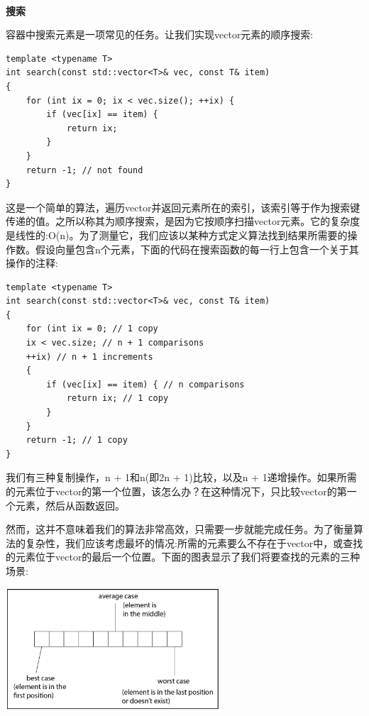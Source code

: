 \noindent\textbf{}\ \par
\textbf{搜索} \ \par
容器中搜索元素是一项常见的任务。让我们实现vector元素的顺序搜索: \par

\begin{lstlisting}[caption={}]
template <typename T>
int search(const std::vector<T>& vec, const T& item)
{
	for (int ix = 0; ix < vec.size(); ++ix) {
		if (vec[ix] == item) {
			return ix;
		}
	}
	return -1; // not found
}
\end{lstlisting}

这是一个简单的算法，遍历vector并返回元素所在的索引，该索引等于作为搜索键传递的值。之所以称其为顺序搜索，是因为它按顺序扫描vector元素。它的复杂度是线性的:O(n)。为了测量它，我们应该以某种方式定义算法找到结果所需要的操作数。假设向量包含n个元素，下面的代码在搜索函数的每一行上包含一个关于其操作的注释: \par

\begin{lstlisting}[caption={}]
template <typename T>
int search(const std::vector<T>& vec, const T& item)
{
	for (int ix = 0; // 1 copy
	ix < vec.size; // n + 1 comparisons
	++ix) // n + 1 increments
	{
		if (vec[ix] == item) { // n comparisons
			return ix; // 1 copy
		}
	}
	return -1; // 1 copy
}
\end{lstlisting}

我们有三种复制操作，n + 1和n(即2n + 1)比较，以及n + 1递增操作。如果所需的元素位于vector的第一个位置，该怎么办？在这种情况下，只比较vector的第一个元素，然后从函数返回。 \par
然而，这并不意味着我们的算法非常高效，只需要一步就能完成任务。为了衡量算法的复杂性，我们应该考虑最坏的情况:所需的元素要么不存在于vector中，或查找的元素位于vector的最后一个位置。下面的图表显示了我们将要查找的元素的三种场景: \par

\begin{center}
	\includegraphics[width=0.6\textwidth]{content/Section-2/Chapter-6/20}
\end{center}

